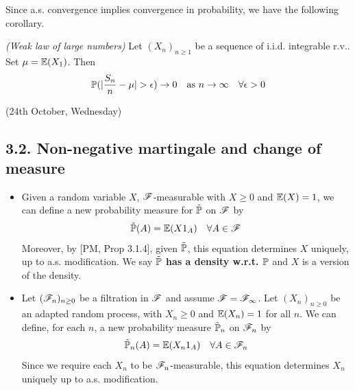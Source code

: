\documentclass[12pt,a4paper]{report}
\begin{document}
Since a.s. convergence implies convergence in probability, we have the following corollary.
\s

 \emph{(Weak law of large numbers)} Let $(X_n)_{n\geq 1}$ be a sequence of i.i.d. integrable r.v.. Set $\mu =\mathbb{E}(X_1)$. Then 
\begin{align*}
\mathbb{P}(|\frac{S_n}{n} -\mu| > \epsilon) \rightarrow 0 \quad \text{as } n\rightarrow \infty \quad \forall \epsilon >0
\end{align*}
\s

\newday

(24th October, Wednesday)
\s

\subsection*{3.2. Non-negative martingale and change of measure}
\newcommand{\nprob}{\tilde{\prob}}

\begin{itemize}
\item Given a random variable $X$, $\mathscr{F}$-measurable with $X\geq 0$ and $\mathbb{E}(X) =1$, we can define a new probability measure for $\tilde{\mathbb{P}}$ on $\mathscr{F}$ by
\begin{align*}
\tilde{\mathbb{P}}(A) = \mathbb{E}(X1_A) \quad \forall A\in \mathscr{F}
\end{align*}
Moreover, by [PM, Prop 3.1.4], given $\nprob$, this equation determines $X$ uniquely, up to a.s. modification. We say \textbf{$\nprob$ has a density w.r.t. $\mathbb{P}$} and $X$ is a version of the density.
\item Let $(\mathscr{F}_n)_{n\geq 0}$ be a filtration in $\mathscr{F}$ and assume $\mathscr{F} = \mathscr{F}_{\infty}$. Let $(X_n)_{n\geq 0}$ be an adapted random process, with $X_n \geq 0$ and $\mathbb{E}(X_n) =1$ for all $n$. We can define, for each $n$, a new probability measure $\nprob_n$ on $\mathscr{F}_n$ by
\begin{align*}
\nprob_n (A) = \avg(X_n 1_A) \quad \forall A\in \F_n
\end{align*}
Since we require each $X_n$ to be $\mathscr{F}_n$-measurable, this equation determines $X_n$ uniquely up to a.s. modification. 
\end{itemize}
\s
\end{document}
